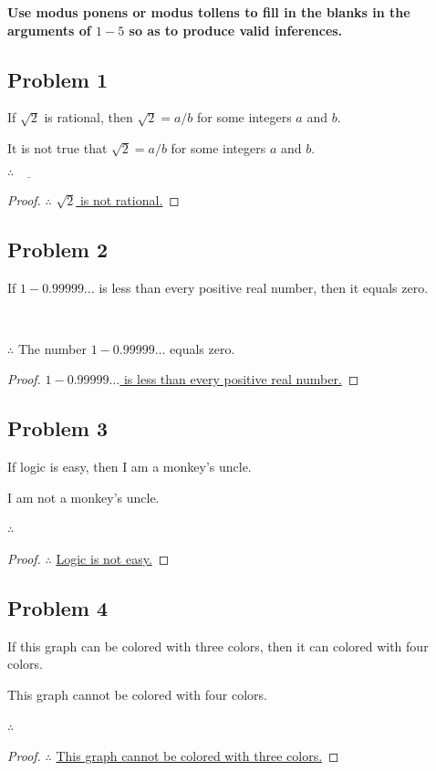 \documentclass[14pt]{extarticle}
\newcommand{\fbl}{\underline{\hspace{1cm}}\,\,}
\begin{document}
{\bf \color{cyan} Use modus ponens or modus tollens to fill in the blanks in the
arguments of $1-5$ so as to produce valid inferences.}

\subsection{Problem 1}
If $\sqrt{2}$ is rational, then $\sqrt{2} = a / b$ for some integers $a$ and
$b$.

It is not true that $\sqrt{2} = a / b$ for some integers $a$ and $b$.

$\therefore \fbl$

\begin{proof}
$\therefore$ \underline{$\sqrt{2}$ is not rational.}
\end{proof}

\subsection{Problem 2}
If $1 - 0.99999\ldots$ is less than every positive real
number, then it equals zero.

\fbl

$\therefore$ The number $1 - 0.99999\ldots$ equals zero.

\begin{proof}
\underline{$1 - 0.99999\ldots$ is less than every positive real
number.}
\end{proof}

\subsection{Problem 3}
If logic is easy, then I am a monkey’s uncle.

I am not a monkey’s uncle.

$\therefore$ \fbl

\begin{proof}
$\therefore$ \underline{Logic is not easy.}
\end{proof}

\subsection{Problem 4}
If this graph can be colored with three colors, then it can colored with four
colors.

This graph cannot be colored with four colors.

$\therefore$ \fbl

\begin{proof}
$\therefore$ \underline{This graph cannot be colored with three colors.}
\end{proof}
\end{document}
